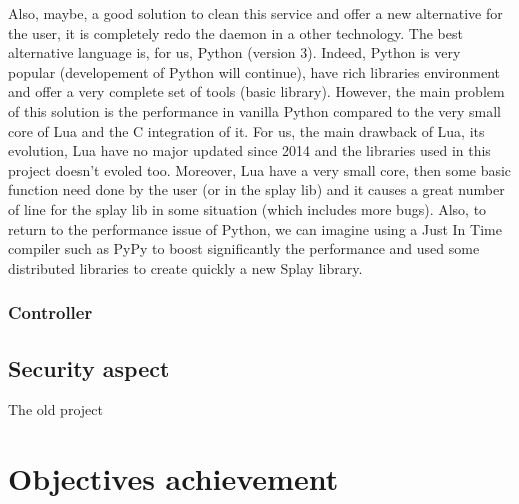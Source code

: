\documentclass{eplmastersthesis}
\begin{document}
          Also, maybe, a good solution to clean this service and offer a new alternative for the user, it is completely 
          redo the daemon in a other technology. The best alternative language is, for us, Python (version 3). Indeed, Python is very 
          popular (developement of Python will continue), have rich libraries environment and offer a very complete
          set of tools (basic library). However, the main problem of this solution is the performance in vanilla Python compared 
          to the very small core of Lua and the C integration of it. For us, the main drawback of Lua, its evolution, Lua have no
          major updated since 2014 and the libraries used in this project doesn't evoled too. 
          Moreover, Lua have a very small core, then some basic function need done by the user (or in the splay lib) and 
          it causes a great number of line for the splay lib in some situation (which includes more bugs). Also, to return 
          to the performance issue of Python, we can imagine using a Just In Time compiler such as PyPy \cite{PyPy} to boost 
          significantly the performance and used some distributed libraries to create quickly a new Splay library.

        \subsubsection{Controller}

      \subsection{Security aspect}
      The old project 


    \section{Objectives achievement}

  \nocite{*}
  
  

  \backcoverpage
\end{document}
